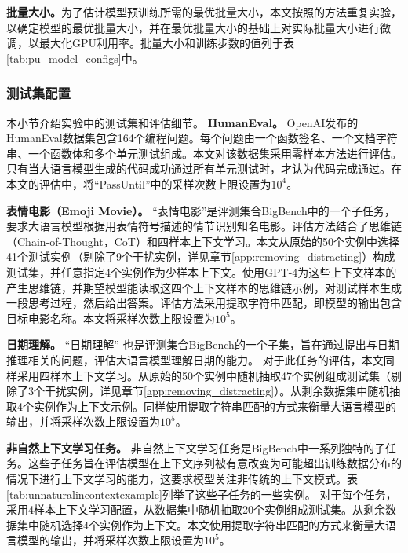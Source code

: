 \textbf{批量大小。}为了估计模型预训练所需的最优批量大小，本文按照\citet{kaplan2020scaling}的方法重复实验，以确定模型的最优批量大小，并在最优批量大小的基础上对实际批量大小进行微调，以最大化GPU利用率。批量大小和训练步数的值列于表\ref{tab:pu_model_configs}中。 

\subsubsection{测试集配置}
\label{app:testset}
本小节介绍实验中的测试集和评估细节。
\textbf{HumanEval。}
\label{app:humaneval}
OpenAI发布的HumanEval\citep{chen2021evaluating}数据集包含164个编程问题。每个问题由一个函数签名、一个文档字符串、一个函数体和多个单元测试组成。本文对该数据集采用零样本方法进行评估。只有当大语言模型生成的代码成功通过所有单元测试时，才认为代码完成通过。在本文的评估中，将“PassUntil”中的采样次数上限设置为\(10^4\)。

\textbf{表情电影（Emoji Movie）。}
\label{app:emoji_movies}
“表情电影”是评测集合BigBench\citep{srivastava2022beyond}中的一个子任务，要求大语言模型根据用表情符号描述的情节识别知名电影。评估方法结合了思维链（Chain-of-Thought，CoT）和四样本上下文学习。本文从原始的50个实例中选择41个测试实例（剔除了9个干扰实例，详见章节\ref{app:removing_distracting}）构成测试集，并任意指定4个实例作为少样本上下文。使用GPT-4为这些上下文样本的产生思维链，并期望模型能读取这四个上下文样本的思维链示例，对测试样本生成一段思考过程，然后给出答案。评估方法采用提取字符串匹配，即模型的输出包含目标电影名称。本文将采样次数上限设置为\(10^5\)。 

\textbf{日期理解。}
\label{app:dateunderstanding}
“日期理解” 也是评测集合BigBench\citep{srivastava2022beyond}的一个子集，旨在通过提出与日期推理相关的问题，评估大语言模型理解日期的能力。
对于此任务的评估，本文同样采用四样本上下文学习。从原始的50个实例中随机抽取47个实例组成测试集（剔除了3个干扰实例，详见章节\ref{app:removing_distracting}）。从剩余数据集中随机抽取4个实例作为上下文示例。同样使用提取字符串匹配的方式来衡量大语言模型的输出，并将采样次数上限设置为\(10^5\)。

\textbf{非自然上下文学习任务。}
\label{app:unantural_in_context_learning}
非自然上下文学习任务是BigBench\citep{srivastava2022beyond}中一系列独特的子任务。这些子任务旨在评估模型在上下文序列被有意改变为可能超出训练数据分布的情况下进行上下文学习的能力，这要求模型关注非传统的上下文模式。表\ref{tab:unnaturalincontextexample}列举了这些子任务的一些实例。
对于每个任务，采用4样本上下文学习配置，从数据集中随机抽取20个实例组成测试集。从剩余数据集中随机选择4个实例作为上下文。本文使用提取字符串匹配的方式来衡量大语言模型的输出，并将采样次数上限设置为\(10^5\)。


